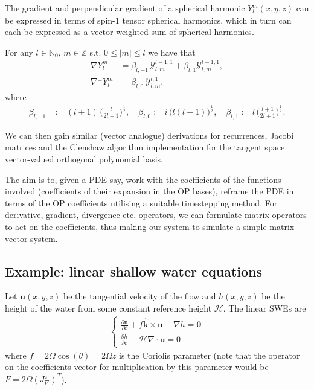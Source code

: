 \documentclass[11pt, oneside]{article}   	%
\newcommand{\half}{\frac{1}{2}}
\newcommand{\Z}{\mathbb{Z}}
\newcommand{\No}{\mathbb{N}_0}
\newcommand{\Ylm}{Y^m_l}
\newcommand{\curlyy}{\bm{\mathcal{Y}}}
\newcommand{\blone}{\beta_{l, 1}}
\newcommand{\blzero}{\beta_{l, 0}}
\newcommand{\blmone}{\beta_{l, -1}}
\newcommand{\unitvec}{\hat{\bm{k}}}
\begin{document}
The gradient and perpendicular gradient of a spherical harmonic \(\Ylm(x,y,z)\) can be expressed in terms of spin-1 tensor spherical harmonics, which in turn can each be expressed as a vector-weighted sum of spherical harmonics.

For any \(l \in \No\), \(m \in \Z\) s.t. \(0 \le |m| \le l\) we have that
\begin{align}
\nabla \Ylm &= \blmone \, \curlyy^{l-1,1}_{l,m} + \blone \curlyy^{l+1,1}_{l,m}, \\
\nabla^\perp \Ylm &= \blzero \, \curlyy^{l,1}_{l,m},
\end{align}
where
\begin{align}
\blmone &:= (l+1) \, \Big(\frac{l}{2l+1}\Big)^\half, \quad
\blzero := i \, \big(l(l+1)\big)^\half, \quad
\blone := l \, \Big(\frac{l+1}{2l+1}\Big)^\half.
\end{align}

We can then gain similar (vector analogue) derivations for recurrences, Jacobi matrices and the Clenshaw algorithm implementation for the tangent space vector-valued orthogonal polynomial basis.

The aim is to, given a PDE say, work with the coefficients of the functions involved (coefficients of their expansion in the OP bases), reframe the PDE in terms of the OP coefficients utilising a suitable timestepping method. For derivative, gradient, divergence etc. operators, we can formulate matrix operators to act on the coefficients, thus making our system to simulate a simple matrix vector system.

\subsection{Example: linear shallow water equations}
Let $\mathbf{u}(x,y,z)$ be the tangential velocity of the flow and $h(x,y,z)$ be the height of the water from some constant reference height $\mathcal{H}$. The linear SWEs are
\begin{align}
\begin{cases}
\frac{\partial \mathbf{u}}{\partial t} + f \unitvec \times \mathbf{u} - \nabla h = \mathbf{0} \\
\frac{\partial h}{\partial t} + \mathcal{H} \nabla \cdot \mathbf{u} = 0
\end{cases}
\end{align}
where $f = 2 \Omega \cos(\theta) =  2 \Omega z$ is the Coriolis parameter (note that the operator on the coefficients vector for multiplication by this parameter would be $F = 2 \Omega (J^z_\nabla)^T$).
\end{document}
